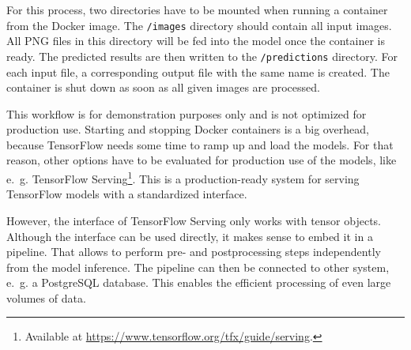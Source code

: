 For this process, two directories have to be mounted when running a container from the Docker image. The \texttt{/images} directory should contain all input images. All PNG files in this directory will be fed into the model once the container is ready. The predicted results are then written to the \texttt{/predictions} directory. For each input file, a corresponding output file with the same name is created. The container is shut down as soon as all given images are processed.

This workflow is for demonstration purposes only and is not optimized for production use. Starting and stopping Docker containers is a big overhead, because TensorFlow needs some time to ramp up and load the models. For that reason, other options have to be evaluated for production use of the models, like e.~g. TensorFlow Serving\footnote{Available at \url{https://www.tensorflow.org/tfx/guide/serving}.}. This is a production-ready system for serving TensorFlow models with a standardized interface.

However, the interface of TensorFlow Serving only works with tensor objects. Although the interface can be used directly, it makes sense to embed it in a pipeline. That allows to perform pre- and postprocessing steps independently from the model inference. The pipeline can then be connected to other system, e.~g. a PostgreSQL database. This enables the efficient processing of even large volumes of data.

\clearpage
